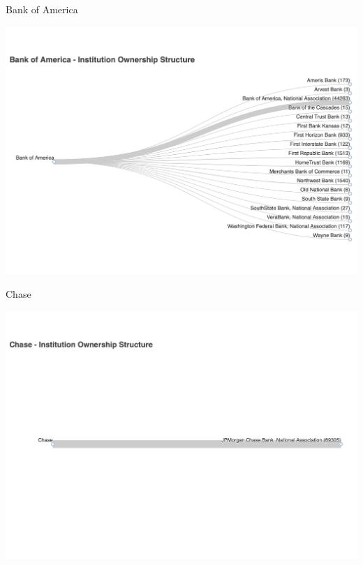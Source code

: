 \documentclass{beamer}
\begin{document}
\begin{frame}{Bank of America}
\begin{center}
\includegraphics[width=1\textwidth]{figure/institution_ownership/Bank of America_ownership_tree.pdf} 
\end{center}
\end{frame}

\begin{frame}{Chase}
\begin{center}
\includegraphics[width=1\textwidth]{figure/institution_ownership/Chase_ownership_tree.pdf} 
\end{center}
\end{frame}
\end{document}
